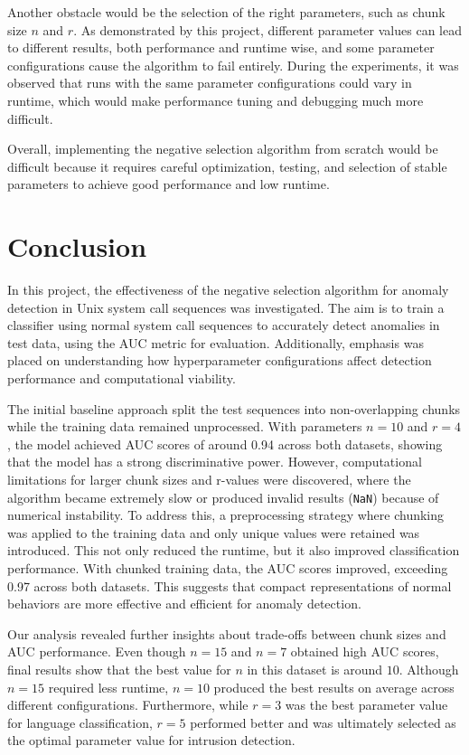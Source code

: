 \documentclass{article}
\begin{document}
Another obstacle would be the selection of the right parameters, such as chunk size $n$ and $r$. As demonstrated by this project, different parameter values can lead to different results, both performance and runtime wise, and some parameter configurations cause the algorithm to fail entirely. During the experiments, it was observed that runs with the same parameter configurations could vary in runtime, which would make performance tuning and debugging much more difficult.

Overall, implementing the negative selection algorithm from scratch would be difficult because it requires careful optimization, testing, and selection of stable parameters to achieve good performance and low runtime.

\section{Conclusion}
In this project, the effectiveness of the negative selection algorithm for anomaly detection in Unix system call sequences was investigated. The aim is to train a classifier using normal system call sequences to accurately detect anomalies in test data, using the AUC metric for evaluation. Additionally, emphasis was placed on understanding how hyperparameter configurations affect detection performance and computational viability. 

The initial baseline approach split the test sequences into non-overlapping chunks while the training data remained unprocessed. With parameters $n=10$ and $r=4$, the model achieved AUC scores of around 0.94 across both datasets, showing that the model has a strong discriminative power. However, computational limitations for larger chunk sizes and r-values were discovered, where the algorithm became extremely slow or produced invalid results (\texttt{NaN}) because of numerical instability. To address this, a preprocessing strategy where chunking was applied to the training data and only unique values were retained was introduced. This not only reduced the runtime, but it also improved classification performance. With chunked training data, the AUC scores improved, exceeding 0.97 across both datasets. This suggests that compact representations of normal behaviors are more effective and efficient for anomaly detection. 

Our analysis revealed further insights about trade-offs between chunk sizes and AUC performance. Even though $n=15$ and $n=7$ obtained high AUC scores, final results show that the best value for $n$ in this dataset is around $10$. Although $n=15$ required less runtime, $n=10$ produced the best results on average across different configurations. Furthermore, while $r=3$ was the best parameter value for language classification, $r=5$ performed better and was ultimately selected as the optimal parameter value for intrusion detection. 
\end{document}
